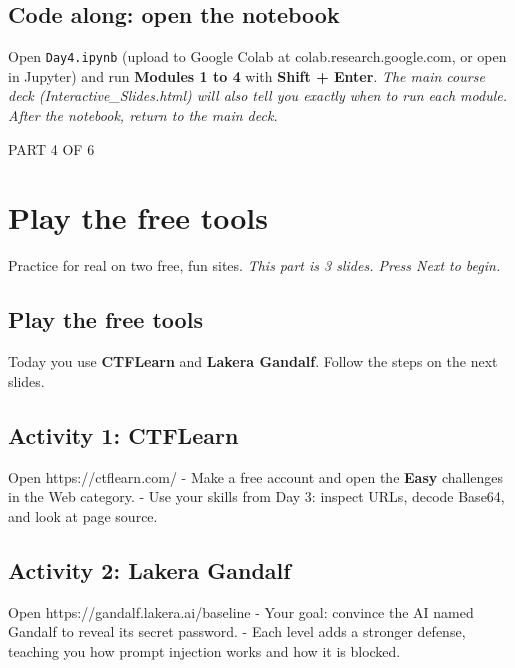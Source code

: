\documentclass[12pt,openany]{book}
\begin{document}
\medskip

\subsection*{Code along: open the notebook}

Open \texttt{Day4.ipynb} (upload to Google Colab at colab.research.google.com, or open in Jupyter) and run \textbf{Modules 1 to 4} with \textbf{Shift + Enter}.
{\small\itshape\color{gray}The main course deck (Interactive\_Slides.html) will also tell you exactly when to run each module. After the notebook, return to the main deck.}

\medskip

\vspace{4pt}\noindent\textsc{PART 4 OF 6}


\section*{Play the free tools}

Practice for real on two free, fun sites.
{\small\itshape\color{gray}This part is 3 slides. Press Next to begin.}

\medskip

\subsection*{Play the free tools}

Today you use \textbf{CTFLearn} and \textbf{Lakera Gandalf}. Follow the steps on the next slides.

\medskip

\subsection*{Activity 1: CTFLearn}


Open https://ctflearn.com/
- Make a free account and open the \textbf{Easy} challenges in the Web category.
- Use your skills from Day 3: inspect URLs, decode Base64, and look at page source.

\medskip

\subsection*{Activity 2: Lakera Gandalf}


Open https://gandalf.lakera.ai/baseline
- Your goal: convince the AI named Gandalf to reveal its secret password.
- Each level adds a stronger defense, teaching you how prompt injection works and how it is blocked.
\end{document}
